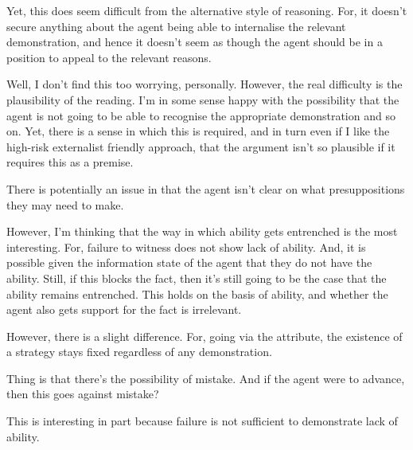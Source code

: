 \documentclass[10pt]{article}
\begin{document}
\begin{note}
  Yet, this does seem difficult from the alternative style of reasoning.
  For, it doesn't secure anything about the agent being able to internalise the relevant demonstration, and hence it doesn't seem as though the agent should be in a position to appeal to the relevant reasons.

  Well, I don't find this too worrying, personally.
  However, the real difficulty is the plausibility of the reading.
  I'm in some sense happy with the possibility that the agent is not going to be able to recognise the appropriate demonstration and so on.
  Yet, there is a sense in which this is required, and in turn even if I like the high-risk externalist friendly approach, that the argument isn't so plausible if it requires this as a premise.

  There is potentially an issue in that the agent isn't clear on what presuppositions they may need to make.

  However, I'm thinking that the way in which ability gets entrenched is the most interesting.
  For, failure to witness does not show lack of ability.
  And, it is possible given the information state of the agent that they do not have the ability.
  Still, if this blocks the fact, then it's still going to be the case that the ability remains entrenched.
  This holds on the basis of ability, and whether the agent also gets support for the fact is irrelevant.

  However, there is a slight difference.
  For, going via the attribute, the existence of a strategy stays fixed regardless of any demonstration.
  


  Thing is that there's the possibility of mistake.
  And if the agent were to advance, then this goes against mistake?

  This is interesting in part because failure is not sufficient to demonstrate lack of ability.
  
\end{note}
\end{document}
